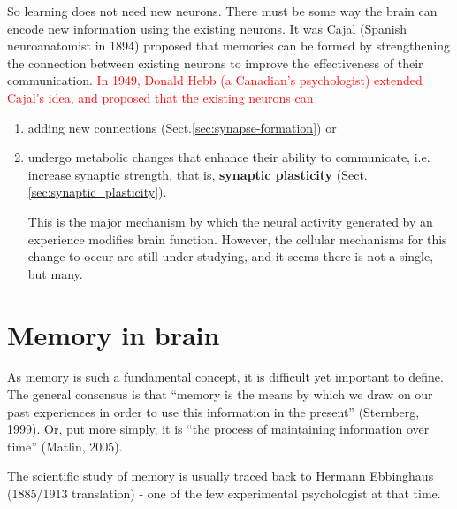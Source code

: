 So learning does not need new neurons. There must be some way the brain can
encode new information using the existing neurons. It was Cajal (Spanish
neuroanatomist in 1894) proposed that memories can be formed by strengthening
the connection between existing neurons to improve the effectiveness of their
communication. \textcolor{red}{In 1949, Donald Hebb (a Canadian's psychologist)
extended Cajal's idea, and proposed that the existing neurons can}
\begin{enumerate}
  
  \item adding new connections (Sect.\ref{sec:synapse-formation}) or 
  
  \item undergo metabolic changes that enhance their ability to
  communicate, i.e. increase synaptic strength, that is, {\bf synaptic
plasticity} (Sect.\ref{sec:synaptic_plasticity}).

This is the major mechanism by which the neural activity generated by an
experience modifies brain function. However, the cellular mechanisms for this
change to occur are still under studying, and it seems there is not a single,
but many.
  
\end{enumerate}




\section{Memory in brain}
\label{sec:memory_brain}

As memory is such a fundamental concept, it is difficult yet important to
define. The general consensus is that “memory is the means by which we draw on
our past experiences in order to use this information in the present”
(Sternberg, 1999).
Or, put more simply, it is “the process of maintaining information over time”
(Matlin, 2005).

The scientific study of memory is usually traced back to Hermann Ebbinghaus
(1885/1913 translation) - one of the few experimental psychologist at that time.

